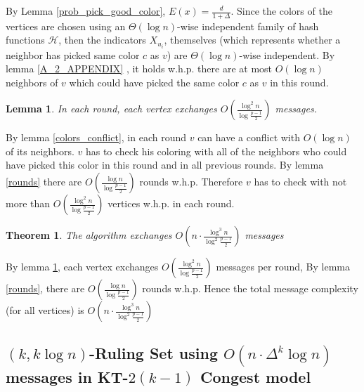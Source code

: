 \documentclass[11pt]{article}
\newtheorem{theorem}{Theorem}
\newtheorem{lemma}{Lemma}
\begin{document}
By Lemma \ref{prob_pick_good_color}, $E(x) = \frac{d}{1 + \Delta}$. Since the colors of the vertices are chosen using an $\Theta(\log{n})$-wise independent family of hash functions $\mathcal{H}$, then the indicators $X_{u_i}$, themselves (which represents whether a neighbor has picked same color $c$ as $v$) are $\Theta(\log{n})$-wise independent. By lemma \ref{A_2_APPENDIX} , it holds w.h.p. there are at most $O(\log{n})$ neighbors of $v$ which could have picked the same color $c$ as $v$ in this round. 

\begin{lemma}
\label{message_per_round}
In each round, each vertex exchanges $O(\frac{\log^2{n}}{\log{\frac{p-1}{2}}})$ messages.
\end{lemma}
By lemma \ref{colors_conflict}, in each round $v$ can have a conflict with $O(\log{n})$ of its neighbors. $v$ has to check his coloring with all of the neighbors who could have picked this color in this round and in all previous rounds. By lemma \ref{rounds} there are $O(\frac{\log{n}}{\log{\frac{p-1}{2}}})$ rounds w.h.p. Therefore $v$ has to check with not more than $O(\frac{\log^2{n}}{\log{\frac{p-1}{2}}})$ vertices w.h.p. in each round.


\begin{theorem}
The algorithm exchanges $O(n\cdot \frac{\log^3{n}}{\log^2{\frac{p-1}{2}}})$ messages
\end{theorem}
By lemma \ref{message_per_round}, each vertex exchanges $O(\frac{\log^2{n}}{\log{\frac{p-1}{2}}})$ messages per round, By lemma \ref{rounds}, there are $O(\frac{\log{n}}{\log{\frac{p-1}{2}}})$ rounds w.h.p. Hence the total message complexity (for all vertices) is $O(n\cdot \frac{\log^3{n}}{\log^2{\frac{p-1}{2}}})$
\newline
\newline

\subsection{\texorpdfstring{$(k, k\log{n})$-Ruling Set using $O(n\cdot\Delta^k\log{n})$ messages in KT-$2(k-1)$ Congest model}{}}
\end{document}

